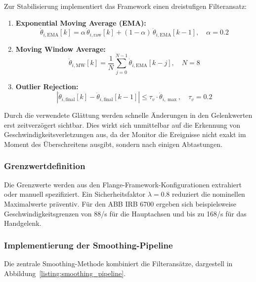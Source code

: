 Zur Stabilisierung implementiert das Framework einen dreistufigen Filteransatz:
\begin{enumerate}
  \item \textbf{Exponential Moving Average (EMA):}
    \begin{equation}
      \dot{\theta}_{i,\mathrm{EMA}}[k]
      = \alpha \,\dot{\theta}_{i,\mathrm{raw}}[k]
      + (1-\alpha)\,\dot{\theta}_{i,\mathrm{EMA}}[k-1],
      \quad \alpha = 0.2
    \end{equation}

  \item \textbf{Moving Window Average:}
    \begin{equation}
      \dot{\theta}_{i,\mathrm{MW}}[k]
      = \frac{1}{N}\sum_{j=0}^{N-1} \dot{\theta}_{i,\mathrm{EMA}}[k-j],
      \quad N = 8
    \end{equation}

  \item \textbf{Outlier Rejection:}
    \begin{equation}
      \left|\dot{\theta}_{i,\mathrm{final}}[k]
      - \dot{\theta}_{i,\mathrm{final}}[k-1]\right|
      \le \tau_v \cdot \dot{\theta}_{i,\max},
      \quad \tau_v = 0.2
    \end{equation}
\end{enumerate}

Durch die verwendete Glättung werden schnelle Änderungen in den Gelenkwerten
erst zeitverzögert sichtbar. Dies wirkt sich unmittelbar auf die Erkennung von
Geschwindigkeitsverletzungen aus, da der Monitor die Ereignisse nicht exakt im
Moment des Überschreitens ausgibt, sondern nach einigen Abtastungen.

\subsubsection{Grenzwertdefinition}
Die Grenzwerte werden aus den
Flange-Framework-Konfigurationen extrahiert oder manuell spezifiziert. Ein
Sicherheitsfaktor $\lambda = 0.8$ reduziert die nominellen Maximalwerte
präventiv. Für den ABB IRB 6700 ergeben sich beispielsweise
Geschwindigkeitsgrenzen von 88\textdegree/s für die Hauptachsen und
bis zu 168\textdegree/s für das
Handgelenk.

\subsubsection{Implementierung der Smoothing-Pipeline}
Die zentrale Smoothing-Methode kombiniert die Filteransätze, dargestell in
Abbildung~\ref{listing:smoothing_pipeline}.

